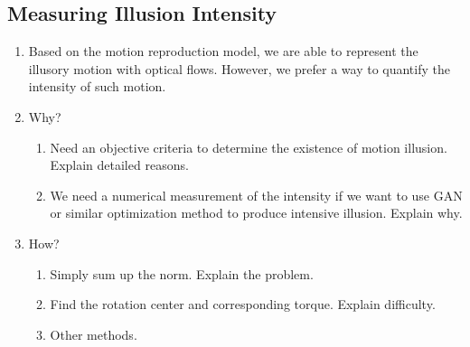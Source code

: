 \documentclass[journal]{IEEEtran}
\begin{document}


\subsection{Measuring Illusion Intensity}
\label{sec:detection_measure}
\begin{enumerate}
  \item Based on the motion reproduction model, we are able to represent the illusory motion with optical flows. However, we prefer a way to quantify the intensity of such motion.
  \item Why? \begin{enumerate}
    \item Need an objective criteria to determine the existence of motion illusion. Explain detailed reasons.
    \item We need a numerical measurement of the intensity if we want to use GAN or similar optimization method to produce intensive illusion. Explain why.
  \end{enumerate}
  \item How? \begin{enumerate}
    \item Simply sum up the norm. Explain the problem.
    \item Find the rotation center and corresponding torque. Explain difficulty.
    \item Other methods.
  \end{enumerate}
\end{enumerate}
\end{document}
